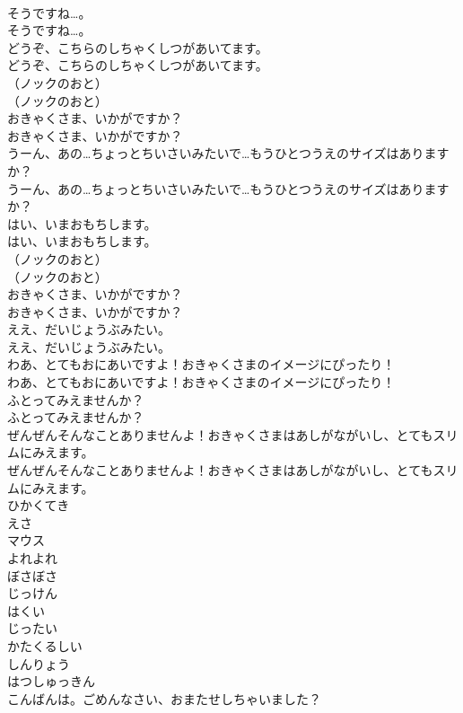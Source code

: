 \documentclass[8pt]{extreport}
\begin{document}
\begin{CJK}{UTF8}{min}
\\	そうですね…。
\\	そうですね…。
\\	どうぞ、こちらのしちゃくしつがあいてます。
\\	どうぞ、こちらのしちゃくしつがあいてます。
\\	（ノックのおと）
\\	（ノックのおと）
\\	おきゃくさま、いかがですか？
\\	おきゃくさま、いかがですか？
\\	うーん、あの…ちょっとちいさいみたいで…もうひとつうえのサイズはありますか？
\\	うーん、あの…ちょっとちいさいみたいで…もうひとつうえのサイズはありますか？
\\	はい、いまおもちします。
\\	はい、いまおもちします。
\\	（ノックのおと）
\\	（ノックのおと）
\\	おきゃくさま、いかがですか？
\\	おきゃくさま、いかがですか？
\\	ええ、だいじょうぶみたい。
\\	ええ、だいじょうぶみたい。
\\	わあ、とてもおにあいですよ！おきゃくさまのイメージにぴったり！
\\	わあ、とてもおにあいですよ！おきゃくさまのイメージにぴったり！
\\	ふとってみえませんか？
\\	ふとってみえませんか？
\\	ぜんぜんそんなことありませんよ！おきゃくさまはあしがながいし、とてもスリムにみえます。
\\	ぜんぜんそんなことありませんよ！おきゃくさまはあしがながいし、とてもスリムにみえます。
\\	ひかくてき
\\	えさ
\\	マウス
\\	よれよれ
\\	ぼさぼさ
\\	じっけん
\\	はくい
\\	じったい
\\	かたくるしい
\\	しんりょう
\\	はつしゅっきん
\\	こんばんは。ごめんなさい、おまたせしちゃいました？

\end{CJK}
\end{document}
